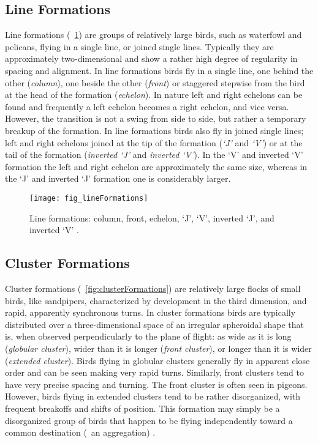\subsection{Line Formations}
Line formations (\fig~\ref{fig:lineFormations}) are groups of relatively large birds, such as waterfowl and pelicans, flying in a single line, or joined single lines. Typically they are approximately two-dimensional and show a rather high degree of regularity in spacing and alignment. In line formations birds fly in a single line, one behind the other (\emph{column}), one beside the other (\emph{front}) or staggered stepwise from the bird at the head of the formation (\emph{echelon}). In nature left and right echelons can be found and frequently a left echelon becomes a right echelon, and vice versa. However, the transition is not a swing from side to side, but rather a temporary breakup of the formation. In line formations birds also fly in joined single lines; left and right echelons joined at the tip of the formation (\emph{`J'} and \emph{`V'}) or at the tail of the formation (\emph{inverted `J'} and \emph{inverted `V'}). In the `V' and inverted `V' formation the left and right echelon are approximately the same size, whereas in the `J' and inverted `J' formation one is considerably larger.

\begin{figure}
  \texttt{[image: fig\_lineFormations]}
  \caption{Line formations: column, front, echelon, `J', `V', inverted `J', and inverted `V' \cite{heppner:1974a}.}
  \label{fig:lineFormations}
\end{figure}

\subsection{Cluster Formations}
Cluster formations (\fig~\ref{fig:clusterFormations}) are relatively large flocks of small birds, like sandpipers, characterized by development in the third dimension, and rapid, apparently synchronous turns. In cluster formations birds are typically distributed over a three-dimensional space of an irregular spheroidal shape that is, when observed perpendicularly to the plane of flight: as wide as it is long (\emph{globular cluster}), wider than it is longer (\emph{front cluster}), or longer than it is wider (\emph{extended cluster}). Birds flying in globular clusters generally fly in apparent close order and can be seen making very rapid turns. Similarly, front clusters tend to have very precise spacing and turning. The front cluster is often seen in pigeons. However, birds flying in extended clusters tend to be rather disorganized, with frequent breakoffs and shifts of position. This formation may simply be a disorganized group of birds that happen to be flying independently toward a common destination (\ie\ an aggregation) \cite{heppner:1974a}.

